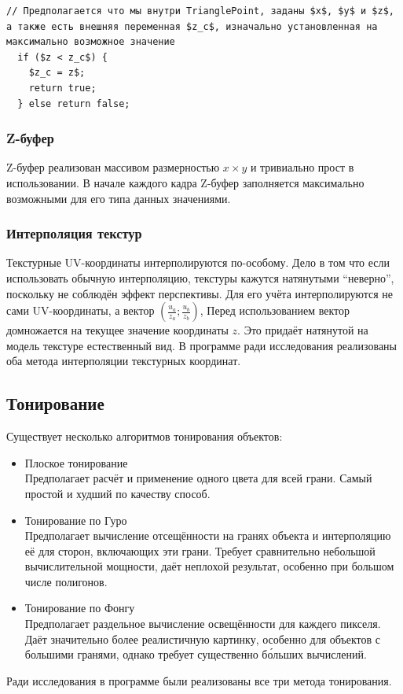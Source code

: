 \documentclass[a4paper,12pt]{report}
\numberwithin{equation}{section}
\begin{document}
\begin{lstlisting}[float=h!,caption={Отслеживания взгляда пользователя},label=trace_algo]
// Предполагается что мы внутри TrianglePoint, заданы $x$, $y$ и $z$, а также есть внешняя переменная $z_c$, изначально установленная на максимально возможное значение
  if ($z < z_c$) {
    $z_c = z$;
    return true;
  } else return false;
\end{lstlisting}

\subsubsection{Z-буфер}
Z-буфер реализован массивом размерностью $x \times y$ и тривиально прост в использовании. В начале каждого кадра Z-буфер заполняется максимально возможными для его типа данных значениями.

\subsubsection{Интерполяция текстур}
Текстурные UV-координаты интерполируются по-особому. Дело в том что если использовать обычную интерполяцию, текстуры кажутся натянутыми ``неверно'', поскольку не соблюдён эффект перспективы. Для его учёта интерполируются не сами UV-координаты, а вектор $\left( \frac{u_a}{z_a}; \frac{u_b}{z_b} \right)$, Перед использованием вектор домножается на текущее значение координаты $z$. Это придаёт натянутой на модель текстуре естественный вид. В программе ради исследования реализованы оба метода интерполяции текстурных координат.

\subsection{Тонирование}
Существует несколько алгоритмов тонирования объектов:
\begin{itemize}
\item Плоское тонирование \\
Предполагает расчёт и применение одного цвета для всей грани. Самый простой и худший по качеству способ.
\item Тонирование по Гуро \\
Предполагает вычисление отсещённости на гранях объекта и интерполяцию её для сторон, включающих эти грани. Требует сравнительно небольшой вычислительной мощности, даёт неплохой результат, особенно при большом числе полигонов.
\item Тонирование по Фонгу \\
Предполагает раздельное вычисление освещённости для каждего пикселя. Даёт значительно более реалистичную картинку, особенно для объектов с большими гранями, однако требует существенно б\'{о}льших вычислений.
\end{itemize}
Ради исследования в программе были реализованы все три метода тонирования.
\end{document}
